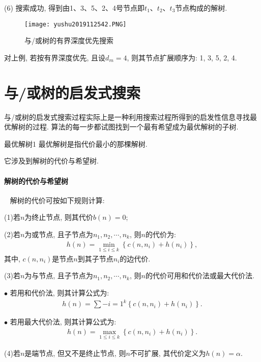 (6) 搜索成功, 得到由1、3、5、2、4号节点即$t_1$、$t_2$、$t_3$节点构成的解树.
\begin{figure}[H]
\centering
\texttt{[image: yushu2019112542.PNG]}
\caption{与/或树的有界深度优先搜索}
\label{AI32fig42}
\end{figure}
对上例, 若按有界深度优先, 且设$d_m=4$, 则其节点扩展顺序为: 1, 3, 5, 2, 4.
\section{与/或树的启发式搜索}
与/或树的启发式搜索过程实际上是一种利用搜索过程所得到的启发性信息寻找最优解树的过程. 算法的每一步都试图找到一个最有希望成为最优解树的子树.
\begin{mydef}{最优解树}{1}
    最优解树是指代价最小的那棵解树.
\end{mydef}
它涉及到解树的代价与希望树.
\paragraph{解树的代价与希望树}~{}
解树的代价可按如下规则计算:

(1)若$n$为终止节点, 则其代价$b(n)=0$;

(2)若$n$为或节点, 且子节点为$n_1, n_2, \cdots ,n_k$, 则$n$的代价为:
    \begin{align}
      h(n)=\min _{1 \leq i \leq k}\left\{c\left(n, n_{i}\right)+h\left(n_{i}\right)\right\},
    \end{align}
其中, $c(n, n_i )$是节点$n$到其子节点$n_i$的边代价.

(3)若$n$为与节点, 且子节点为$n_1, n_2,\cdots,n_k$, 则$n$的代价可用和代价法或最大代价法.

    $\bullet$ 若用和代价法, 则其计算公式为:
    \begin{align}
        h(n)=\sum-{i=1}^{k}\left\{c\left(n, n_{i}\right)+h\left(n_{i}\right)\right\}.
    \end{align}

    $\bullet$ 若用最大代价法, 则其计算公式为:
    \begin{align}
        h(n)=\max _{1 \leq i \leq k}\left\{c\left(n, n_{i}\right)+h\left(n_{i}\right)\right\}.
    \end{align}

(4)若$n$是端节点, 但又不是终止节点, 则$n$不可扩展, 其代价定义为$h(n)=\alpha$.

